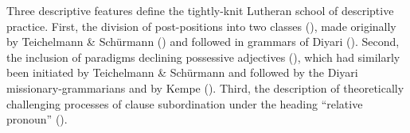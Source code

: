 Three descriptive features define the tightly-knit Lutheran school of descriptive practice. First, the division of post-positions into two classes (), made originally by Teichelmann \& Schürmann () and followed in grammars of Diyari (). Second, the inclusion of paradigms declining possessive adjectives (), which had similarly been initiated by Teichelmann \& Schürmann and followed by the Diyari missionary-grammarians and by Kempe (). Third, the description of theoretically challenging processes of clause subordination under the heading “relative pronoun” ().
